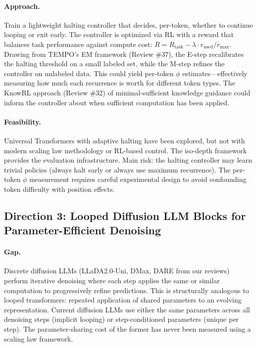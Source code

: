 \documentclass[11pt]{article}
\begin{document}
\paragraph{Approach.}
Train a lightweight halting controller that decides, per-token, whether to continue looping or exit early. The controller is optimized via RL with a reward that balances task performance against compute cost: $R = R_{\mathrm{task}} - \lambda \cdot r_{\mathrm{used}}/r_{\mathrm{max}}$. Drawing from TEMPO's EM framework (Review \#37), the E-step recalibrates the halting threshold on a small labeled set, while the M-step refines the controller on unlabeled data. This could yield per-token $\phi$ estimates---effectively measuring how much each recurrence is worth for different token types. The KnowRL approach (Review \#32) of minimal-sufficient knowledge guidance could inform the controller about when sufficient computation has been applied.

\paragraph{Feasibility.}
Universal Transformers with adaptive halting have been explored, but not with modern scaling law methodology or RL-based control. The iso-depth framework provides the evaluation infrastructure. Main risk: the halting controller may learn trivial policies (always halt early or always use maximum recurrence). The per-token $\phi$ measurement requires careful experimental design to avoid confounding token difficulty with position effects.

\subsection{Direction 3: Looped Diffusion LLM Blocks for Parameter-Efficient Denoising}

\paragraph{Gap.}
Discrete diffusion LLMs (LLaDA2.0-Uni, DMax, DARE from our reviews) perform iterative denoising where each step applies the same or similar computation to progressively refine predictions. This is structurally analogous to looped transformers: repeated application of shared parameters to an evolving representation. Current diffusion LLMs use either the same parameters across all denoising steps (implicit looping) or step-conditioned parameters (unique per step). The parameter-sharing cost of the former has never been measured using a scaling law framework.
\end{document}
